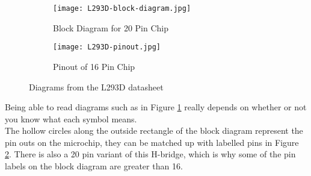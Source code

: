 \documentclass[../TinyBot.tex]{subfiles}
\begin{document}
        

\begin{figure}[h]
    \centering

    \begin{subfigure}[t]{0.5\textwidth}
        \texttt{[image: L293D-block-diagram.jpg]}
        \caption{Block Diagram for 20 Pin Chip}
        \label{fig:l293d-block-diagram}
    \end{subfigure}
    \begin{subfigure}[t]{0.3\textwidth}
        \centering
        \texttt{[image: L293D-pinout.jpg]}
        \caption{Pinout of 16 Pin Chip}
        \label{fig:l293d-pinout}
    \end{subfigure}

    \caption{Diagrams from the L293D datasheet}
    \label{fig:l293d}
\end{figure}


\FloatBarrier


Being able to read diagrams such as in Figure \ref{fig:l293d-block-diagram} really depends
on whether or not you know what each symbol means. \\


The hollow circles along the outside rectangle of the block diagram represent the pin outs
on the microchip, they can be matched up with labelled pins in Figure \ref{fig:l293d-pinout}.
There is also a 20 pin variant of this H-bridge, which is why some of the pin labels on the
block diagram are greater than 16.\\
\end{document}
